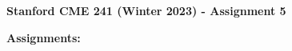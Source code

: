 \documentclass[12pt]{exam}
\begin{document}
\begin{center}
{\large {\bf Stanford CME 241 (Winter 2023) - Assignment 5}}
\end{center}
 
{\large{\bf Assignments:}}
\begin{questions}
%
%
%


\end{questions}
\end{document}
